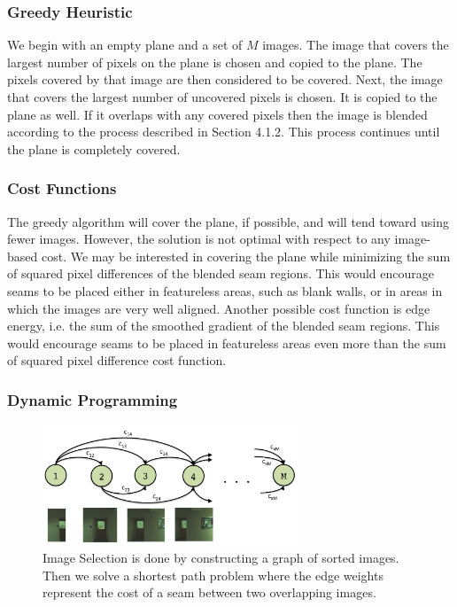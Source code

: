 \documentclass[runningheads]{llncs}
\begin{document}
\subsubsection{Greedy Heuristic}

We begin with an empty plane and a set of $M$ images. The image that covers the largest number of pixels on the plane is chosen and copied to the plane. The pixels covered by that image are then considered to be covered. Next, the image that covers the largest number of uncovered pixels is chosen. It is copied to the plane as well. If it overlaps with any covered pixels then the image is blended according to the process described in Section 4.1.2. This process continues until the plane is completely covered. 

\subsubsection{Cost Functions}

The greedy algorithm will cover the plane, if possible, and will tend toward using fewer images. However, the solution is not optimal with respect to any image-based cost. We may be interested in covering the plane while minimizing the sum of squared pixel differences of the blended seam regions. This would encourage seams to be placed either in featureless areas, such as blank walls, or in areas in which the images are very well aligned. Another possible cost function is edge energy, i.e. the sum of the smoothed gradient of the blended seam regions. This would encourage seams to be placed in featureless areas even more than the sum of squared pixel difference cost function. 


\subsubsection{Dynamic Programming}

\begin{figure}
\centering
\includegraphics[width=3in]{DynProg.pdf}
\caption{Image Selection is done by constructing a graph of sorted images. Then we solve a shortest path problem where the edge weights represent the cost of a seam between two overlapping images.}
\label{fig:DynProg}
\end{figure}
\end{document}

